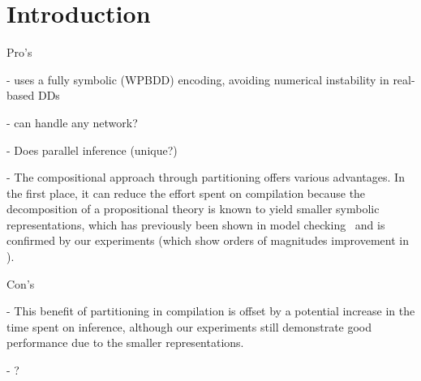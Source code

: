 
\section{Introduction}
\label{sec:introduction}




Pro's

- uses a fully symbolic (WPBDD) encoding, avoiding numerical instability in real-based DDs

- can handle any network?

- Does parallel inference (unique?)

- The compositional approach through partitioning offers various advantages. In the first place, it can reduce the effort spent on compilation because the decomposition of a propositional theory is known to yield smaller symbolic representations, which has previously been shown in model checking~\cite{narayan1996partitioned,sahoo2004partitioning,grumberg2006work} and is confirmed by our experiments (which show orders of magnitudes improvement in ).


Con's 

- This benefit of partitioning in compilation is offset by a potential increase in the time spent on inference, although our experiments still demonstrate good performance due to the smaller representations.

-  ?
